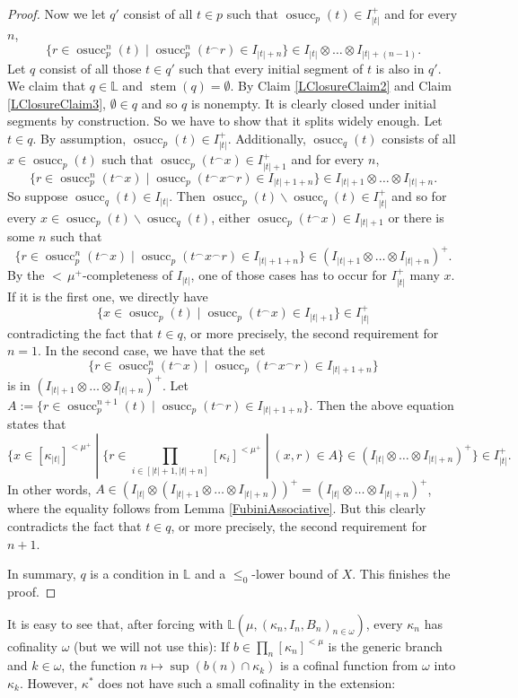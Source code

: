 \documentclass[a4paper]{amsart}
\theoremstyle{definition}
\theoremstyle{remark}
\theoremstyle{plain}
\numberwithin{mydef}{section}
\DeclareMathOperator{\stem}{stem}
\DeclareMathOperator{\osucc}{osucc}
\newcommand{\dL}{\mathbb{L}}
\begin{document}
\begin{proof}
		Now we let $q'$ consist of all $t\in p$ such that $\osucc_p(t)\in I_{|t|}^+$ and for every $n$,
		$$\{r\in\osucc_p^n(t)\;|\;\osucc_p^n(t^{\frown}r)\in I_{|t|+n}\}\in I_{|t|}\otimes\dots\otimes I_{|t|+(n-1)}.$$
		Let $q$ consist of all those $t\in q'$ such that every initial segment of $t$ is also in $q'$. We claim that $q\in\dL$ and $\stem(q)=\emptyset$. By Claim \ref{LClosureClaim2} and Claim \ref{LClosureClaim3}, $\emptyset\in q$ and so $q$ is nonempty. It is clearly closed under initial segments by construction. So we have to show that it splits widely enough. Let $t\in q$. By assumption, $\osucc_p(t)\in I_{|t|}^+$. Additionally, $\osucc_q(t)$ consists of all $x\in\osucc_p(t)$ such that $\osucc_p(t^{\frown}x)\in I_{|t|+1}^+$ and for every $n$,
		$$\{r\in\osucc_p^n(t^{\frown}x)\;|\;\osucc_p(t^{\frown}x^{\frown}r)\in I_{|t|+1+n}\}\in I_{|t|+1}\otimes\dots\otimes I_{|t|+n}.$$
		So suppose $\osucc_q(t)\in I_{|t|}$. Then $\osucc_p(t)\smallsetminus\osucc_q(t)\in I_{|t|}^+$ and so for every $x\in\osucc_p(t)\smallsetminus\osucc_q(t)$, either $\osucc_p(t^{\frown}x)\in I_{|t|+1}$ or there is some $n$ such that
		$$\{r\in\osucc_p^n(t^{\frown}x)\;|\;\osucc_p(t^{\frown}x^{\frown}r)\in I_{|t|+1+n}\}\in (I_{|t|+1}\otimes\dots\otimes I_{|t|+n})^+.$$
		By the ${<}\,\mu^+$-completeness of $I_{|t|}$, one of those cases has to occur for $I_{|t|}^+$ many $x$. If it is the first one, we directly have
		$$\{x\in\osucc_p(t)\;|\;\osucc_p(t^{\frown}x)\in I_{|t|+1}\}\in I_{|t|}^+$$
		contradicting the fact that $t\in q$, or more precisely, the second requirement for $n=1$. In the second case, we have that the set
		$$\{r\in\osucc_p^n(t^{\frown}x)\;|\;\osucc_p(t^{\frown}x^{\frown}r)\in I_{|t|+1+n}\}$$
		is in $(I_{|t|+1}\otimes\dots\otimes I_{|t|+n})^+$. Let $A:=\{r\in\osucc_p^{n+1}(t)\;|\;\osucc_p(t^{\frown}r)\in I_{|t|+1+n}\}$. Then the above equation states that
		$$\{x\in [\kappa_{|t|}]^{<\mu^+}\;|\;\{r\in\prod_{i\in[|t|+1,|t|+n]}[\kappa_i]^{<\mu^+}\;|\;(x,r)\in A\}\in(I_{|t|}\otimes\dots\otimes I_{|t|+n})^+\}\in I_{|t|}^+.$$
		In other words, $A\in(I_{|t|}\otimes(I_{|t|+1}\otimes\dots\otimes I_{|t|+n}))^+=(I_{|t|}\otimes\dots\otimes I_{|t|+n})^+$, where the equality follows from Lemma \ref{FubiniAssociative}. But this clearly contradicts the fact that $t\in q$, or more precisely, the second requirement for $n+1$.
		
		In summary, $q$ is a condition in $\dL$ and a $\leq_0$-lower bound of $X$. This finishes the proof.
	\end{proof}
	
	It is easy to see that, after forcing with $\dL(\mu,(\kappa_n,I_n,B_n)_{n\in\omega})$, every $\kappa_n$ has cofinality $\omega$ (but we will not use this): If $b\in\prod_n[\kappa_n]^{<\mu}$ is the generic branch and $k\in\omega$, the function $n\mapsto\sup(b(n)\cap\kappa_k)$ is a cofinal function from $\omega$ into $\kappa_k$. However, $\kappa^*$ does not have such a small cofinality in the extension:
	
\end{document}
